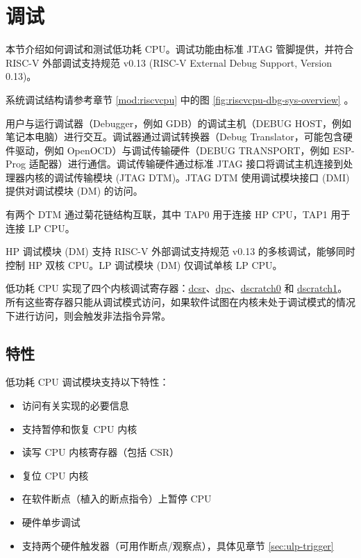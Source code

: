 \documentclass[main\_\_CN.tex]{subfiles}
\begin{document}
\section{调试}

本节介绍如何调试和测试低功耗 CPU。调试功能由标准 JTAG 管脚提供，并符合 RISC-V 外部调试支持规范 v0.13 (RISC-V External Debug Support, Version 0.13)。

\chipname{} 系统调试结构请参考章节 \ref{mod:riscvcpu} \textit{} 中的图 \ref{fig:riscvcpu-dbg-sys-overview} \textit{}。

用户与运行调试器（Debugger，例如 GDB）的调试主机（DEBUG HOST，例如笔记本电脑）进行交互。调试器通过调试转换器（Debug Translator，可能包含硬件驱动，例如 OpenOCD）与调试传输硬件（DEBUG TRANSPORT，例如 ESP-Prog 适配器）进行通信。调试传输硬件通过标准 JTAG 接口将调试主机连接到处理器内核的调试传输模块 (JTAG DTM)。JTAG DTM 使用调试模块接口 (DMI) 提供对调试模块 (DM) 的访问。

\chipname{} 有两个 DTM 通过菊花链结构互联，其中 TAP0 用于连接 HP CPU，TAP1 用于连接 LP CPU。

HP 调试模块 (DM) 支持 RISC-V 外部调试支持规范 v0.13 的多核调试，能够同时控制 HP 双核 CPU。LP 调试模块 (DM) 仅调试单核 LP CPU。



低功耗 CPU 实现了四个内核调试寄存器：\hyperref[regdesc:LPDCSR]{dcsr}、\hyperref[regdesc:LPDPC]{dpc}、\hyperref[regdesc:LPDSCRATCH0]{dscratch0} 和 \hyperref[regdesc:LPDSCRATCH1]{dscratch1}。所有这些寄存器只能从调试模式访问，如果软件试图在内核未处于调试模式的情况下进行访问，则会触发非法指令异常。

\subsection{特性}
低功耗 CPU 调试模块支持以下特性：
\begin{itemize}
    \item 访问有关实现的必要信息
    \item 支持暂停和恢复 CPU 内核
    \item 读写 CPU 内核寄存器（包括 CSR）
    \item 复位 CPU 内核
    \item 在软件断点（植入的断点指令）上暂停 CPU
    \item 硬件单步调试
    \item 支持两个硬件触发器（可用作断点/观察点），具体见章节 \ref{sec:ulp-trigger}
\end{itemize}
\end{document}
